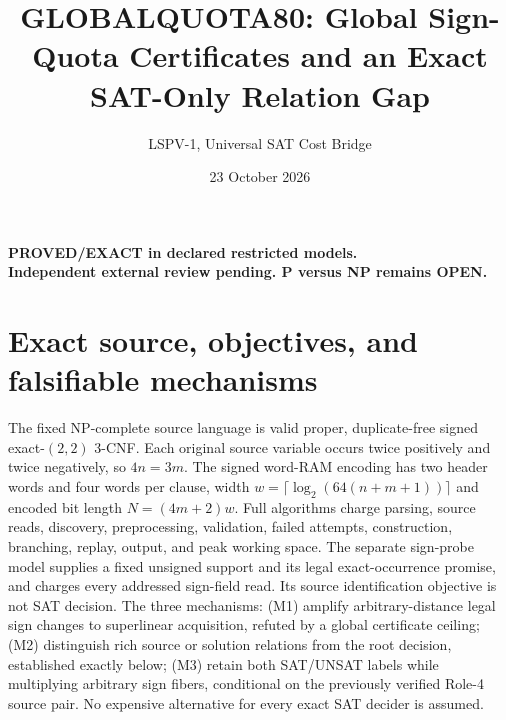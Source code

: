 \documentclass[11pt]{article}
\title{GLOBALQUOTA80: Global Sign-Quota Certificates and an Exact SAT-Only Relation Gap}
\author{LSPV-1, Universal SAT Cost Bridge}
\date{23 October 2026}
\begin{document}
\maketitle
\begin{center}\textbf{PROVED/EXACT in declared restricted models.}\\
\textbf{Independent external review pending. P versus NP remains OPEN.}\end{center}
\section{Exact source, objectives, and falsifiable mechanisms}
The fixed NP-complete source language is valid proper, duplicate-free signed exact-$(2,2)$ 3-CNF. Each original source variable occurs twice positively and twice negatively, so $4n=3m$. The signed word-RAM encoding has two header words and four words per clause, width $w=\lceil\log_2(64(n+m+1))\rceil$ and encoded bit length $N=(4m+2)w$. Full algorithms charge parsing, source reads, discovery, preprocessing, validation, failed attempts, construction, branching, replay, output, and peak working space. The separate sign-probe model supplies a fixed unsigned support and its legal exact-occurrence promise, and charges every addressed sign-field read. Its source identification objective is not SAT decision. The three mechanisms: (M1) amplify arbitrary-distance legal sign changes to superlinear acquisition, refuted by a global certificate ceiling; (M2) distinguish rich source or solution relations from the root decision, established exactly below; (M3) retain both SAT/UNSAT labels while multiplying arbitrary sign fibers, conditional on the previously verified Role-4 source pair. No expensive alternative for every exact SAT decider is assumed.
\end{document}
